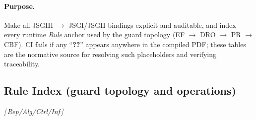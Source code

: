 \documentclass[10pt]{article}
\newcommand{\layertag}[1]{\textsf{\footnotesize[\,#1\,]}}
\begin{document}
\paragraph{Purpose.}
Make all JSGIII $\rightarrow$ JSGI/JSGII bindings explicit and auditable, and index every runtime \emph{Rule} anchor used by the guard topology (EF $\rightarrow$ DRO $\rightarrow$ PR $\rightarrow$ CBF). CI fails if any “\textbf{??}” appears anywhere in the compiled PDF; these tables are the normative source for resolving such placeholders and verifying traceability.

\subsection{Rule Index (guard topology and operations)}\label{app:resolution-rules}
\emph{\layertag{Rep/Alg/Ctrl/Inf}}
\end{document}
